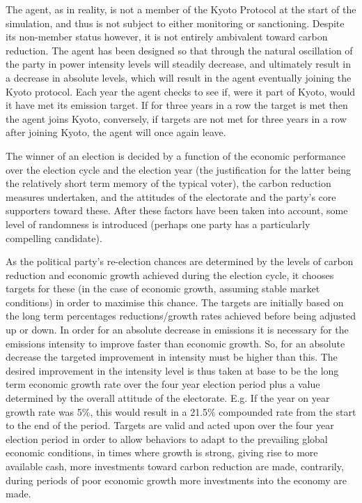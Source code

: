 The agent, as in reality, is not a member of the Kyoto Protocol at the start of the simulation, and thus is not subject to either monitoring or sanctioning. Despite its non-member status however, it is not entirely ambivalent toward carbon reduction. The agent has been designed so that through the natural oscillation of the party in power intensity levels will steadily decrease, and ultimately result in a decrease in absolute levels, which will result in the agent eventually joining the Kyoto protocol. Each year the agent checks to see if, were it part of Kyoto, would it have met its emission target. If for three years in a row the target is met then the agent joins Kyoto, conversely, if targets are not met for three years in a row after joining Kyoto, the agent will once again leave.

The winner of an election is decided by a function of the economic performance over the election cycle and the election year (the justification for the latter being the relatively short term memory of the typical voter), the carbon reduction measures undertaken, and the attitudes of the electorate and the party's core supporters toward these. After these factors have been taken into account, some level of randomness is introduced (perhaps one party has a particularly compelling candidate).

As the political party's re-election chances are determined by the levels of carbon reduction and economic growth achieved during the election cycle, it chooses targets for these (in the case of economic growth, assuming stable market conditions) in order to maximise this chance. The targets are initially based on the long term percentages reductions/growth rates achieved before being adjusted up or down. In order for an absolute decrease in emissions it is necessary for the emissions intensity to improve faster than economic growth. So, for an absolute decrease the targeted improvement in intensity must be higher than this. The desired improvement in the intensity level is thus taken at base to be the long term economic growth rate over the four year election period plus a value determined by the overall attitude of the electorate. E.g. If the year on year growth rate was 5\%, this would result in a 21.5\% compounded rate from the start to the end of the period. Targets are valid and acted upon over the four year election period in order to allow behaviors to adapt to the prevailing global economic conditions, in times where growth is strong, giving rise to more available cash, more investments toward carbon reduction are made, contrarily, during periods of poor economic growth more investments into the economy are made. 

